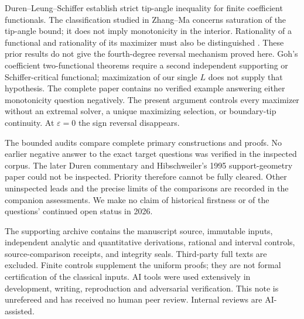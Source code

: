 \documentclass[10pt]{article}
\newcommand{\eps}{\varepsilon}
\begin{document}
Duren--Leung--Schiffer \cite{DLS} establish strict tip-angle inequality
for finite coefficient functionals. The classification studied in
Zhang--Ma \cite{ZM} concerns saturation of the tip-angle bound;
it does not imply monotonicity in the interior.
Rationality of a functional and rationality of its maximizer must also
be distinguished \cite{Brickman,Goh}. These prior results do not give
the fourth-degree reversal mechanism proved here.
Goh's coefficient two-functional theorems \cite{Goh92} require
a second independent supporting or Schiffer-critical functional;
maximization of our single \(L\) does not supply that hypothesis.
The complete paper contains no verified example answering either
monotonicity question negatively.
The present argument controls every maximizer without an extremal
solver, a unique maximizing selection, or boundary-tip continuity.
At \(\eps=0\) the sign reversal disappears.

The bounded audits compare complete primary constructions and proofs.
No earlier negative answer to the exact target questions was verified
in the inspected corpus. The later Duren commentary \cite{DurenComment}
and Hibschweiler's 1995 support-geometry paper \cite{Hib95} could not
be inspected. Priority therefore cannot be fully cleared. Other
uninspected leads and the precise limits of the comparisons are
recorded in the companion assessments. We make no claim of historical
firstness or of the questions' continued open status in 2026.

The supporting archive contains the manuscript source, immutable
inputs, independent analytic and quantitative derivations, rational
and interval controls, source-comparison receipts, and integrity seals.
Third-party full texts are excluded. Finite controls supplement the
uniform proofs; they are not formal certification of the classical
inputs. AI tools were used extensively in development, writing,
reproduction and adversarial verification. This note is unrefereed
and has received no human peer review. Internal reviews are AI-assisted.
\end{document}
